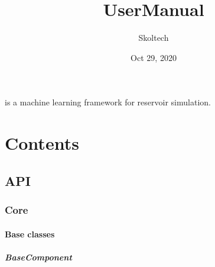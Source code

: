 \documentclass[letterpaper,10pt,english]{sphinxmanual}
\title{UserManual}
\date{Oct 29, 2020}
\author{Skoltech}
\begin{document}
\pagestyle{empty}
\sphinxmaketitle
\pagestyle{plain}
\sphinxtableofcontents
\pagestyle{normal}
\label{\detokenize{index::doc}}


 is a machine learning framework for reservoir simulation.


\chapter{Contents}
\label{\detokenize{index:contents}}

\section{API}
\label{\detokenize{api/geology:api}}\label{\detokenize{api/geology::doc}}

\subsection{Core}
\label{\detokenize{api/core:core}}\label{\detokenize{api/core::doc}}

\subsubsection{Base classes}
\label{\detokenize{api/base_classes:base-classes}}\label{\detokenize{api/base_classes::doc}}

\paragraph{BaseComponent}
\label{\detokenize{api/base_classes:basecomponent}}
\end{document}
